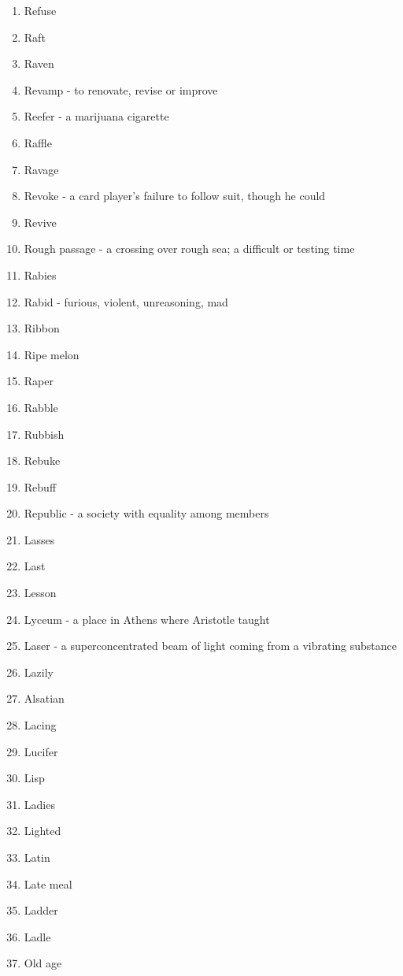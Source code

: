 \begin{enumerate}
        \item Refuse
        \item Raft
        \item Raven
        \item Revamp - to renovate, revise or improve
        \item Reefer - a marijuana cigarette
        \item Raffle
        \item Ravage
        \item Revoke - a card player's failure to follow suit, though he could
        \item Revive
        \item Rough passage - a crossing over rough sea; a difficult or testing time
        \item Rabies
        \item Rabid - furious, violent, unreasoning, mad
        \item Ribbon
        \item Ripe melon
        \item Raper
        \item Rabble
        \item Rubbish
        \item Rebuke
        \item Rebuff
        \item Republic - a society with equality among members
        \item Lasses
        \item Last
        \item Lesson
        \item Lyceum - a place in Athens where Aristotle taught
        \item Laser - a superconcentrated beam of light coming from a vibrating substance
        \item Lazily
        \item Alsatian
        \item Lacing
        \item Lucifer
        \item Lisp
        \item Ladies
        \item Lighted
        \item Latin
        \item Late meal
        \item Ladder
        \item Ladle
        \item Old age

\end{enumerate}
